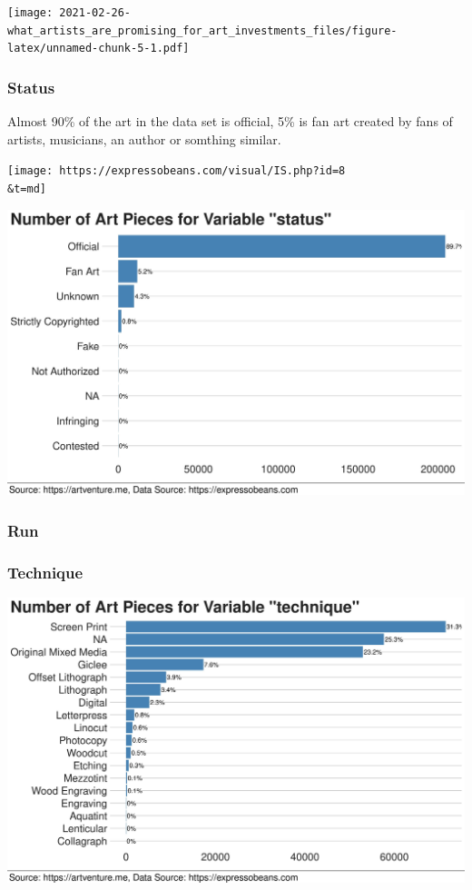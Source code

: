 \documentclass[
]{article}
\begin{document}
\texttt{[image: 2021-02-26-what\_artists\_are\_promising\_for\_art\_investments\_files/figure-latex/unnamed-chunk-5-1.pdf]}

\hypertarget{status}{%
\subsubsection{Status}\label{status}}

Almost 90\% of the art in the data set is official, 5\% is fan art
created by fans of artists, musicians, an author or somthing similar.

\texttt{[image: https://expressobeans.com/visual/IS.php?id=8\\\&t=md]}

\includegraphics[width=46.29in]{status}

\hypertarget{run}{%
\subsubsection{Run}\label{run}}

\hypertarget{technique}{%
\subsubsection{Technique}\label{technique}}

\includegraphics[width=46.29in]{technique}
\end{document}
